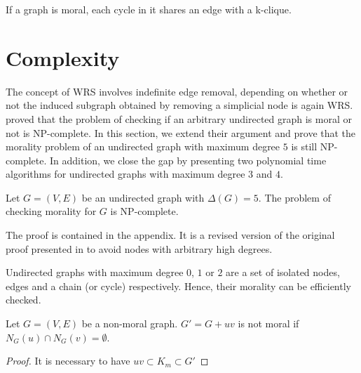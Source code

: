 \begin{remark}
If a graph is moral, each cycle in it shares an edge with a k-clique. 
\end{remark} 


\section{Complexity}
The concept of WRS involves indefinite edge removal, depending on whether or not the induced subgraph obtained by removing a simplicial node is again WRS. \cite{verma1993deciding} proved that the problem of checking if an arbitrary undirected graph is moral or not is NP-complete. In this section, we extend their argument and prove that the morality problem of an undirected graph with maximum degree $5$ is still NP-complete. In addition, we close the gap by presenting two polynomial time algorithms for undirected graphs with maximum degree $3$ and $4$. 

\begin{theorem}
\label{thm:deg5}
Let $G=(V,E)$ be an undirected graph with $\Delta(G)=5$. The problem of checking morality for $G$ is NP-complete. 
\end{theorem}
The proof is contained in the appendix. It is a revised version of the original proof presented in \cite{verma1993deciding} to avoid nodes with arbitrary high degrees.

\begin{remark}
\label{rmk:deg_2}
Undirected graphs with maximum degree $0$, $1$ or $2$ are a set of isolated nodes, edges and a chain (or cycle) respectively. Hence, their morality can be efficiently checked.  
\end{remark}

\begin{lemma}
\label{lm:no_common_nbr}
Let $G=(V,E)$ be a non-moral graph. $G'=G+uv$ is not moral if $N_G(u)\cap N_G(v)=\emptyset$. 
\end{lemma}
\begin{proof}
It is necessary to have $uv \subset K_m \subset G'$ 
\end{proof}

